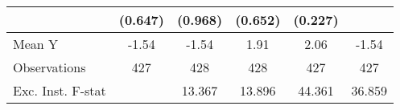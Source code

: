 {\begin{tabular}{l*{5}{c}}
            &     (0.647)         &     (0.968)         &     (0.652)         &     (0.227)         &                     \\
\midrule
Mean Y      &       -1.54         &       -1.54         &        1.91         &        2.06         &       -1.54         \\
Observations&         427         &         428         &         428         &         427         &         427         \\
Exc. Inst. F-stat&                     &      13.367         &      13.896         &      44.361         &      36.859         \\
\bottomrule
\end{tabular}
}
